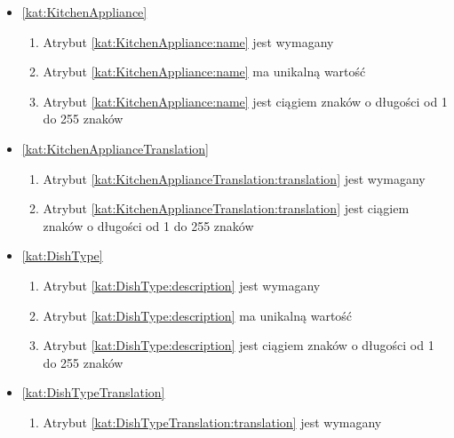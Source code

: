 \begin{itemize}[label={\textbf{Ograniczenia dla}}, wide, labelwidth=!, labelindent=0pt]
    \item\ref{kat:KitchenAppliance}
    \begin{enumerate}[label={\textbf{OGR/\protect\threedigits{\arabic{enumi}}}}, wide, labelwidth=!, align=left, leftmargin=3cm, resume]
        \item Atrybut \ref{kat:KitchenAppliance:name} jest wymagany

        \item Atrybut \ref{kat:KitchenAppliance:name} ma unikalną wartość

        \item Atrybut \ref{kat:KitchenAppliance:name} jest ciągiem znaków o długości od 1 do 255 znaków
    \end{enumerate}

    \item\ref{kat:KitchenApplianceTranslation}
    \begin{enumerate}[label={\textbf{OGR/\protect\threedigits{\arabic{enumi}}}}, wide, labelwidth=!, align=left, leftmargin=3cm, resume]
        \item Atrybut \ref{kat:KitchenApplianceTranslation:translation} jest wymagany

        \item Atrybut \ref{kat:KitchenApplianceTranslation:translation} jest ciągiem znaków o długości od 1 do 255 znaków
    \end{enumerate}

    \item\ref{kat:DishType}
    \begin{enumerate}[label={\textbf{OGR/\protect\threedigits{\arabic{enumi}}}}, wide, labelwidth=!, align=left, leftmargin=3cm, resume]
        \item Atrybut \ref{kat:DishType:description} jest wymagany

        \item Atrybut \ref{kat:DishType:description} ma unikalną wartość

        \item Atrybut \ref{kat:DishType:description} jest ciągiem znaków o długości od 1 do 255 znaków
    \end{enumerate}

    \item\ref{kat:DishTypeTranslation}
    \begin{enumerate}[label={\textbf{OGR/\protect\threedigits{\arabic{enumi}}}}, wide, labelwidth=!, align=left, leftmargin=3cm, resume]
        \item Atrybut \ref{kat:DishTypeTranslation:translation} jest wymagany


\end{enumerate}
\end{itemize}
